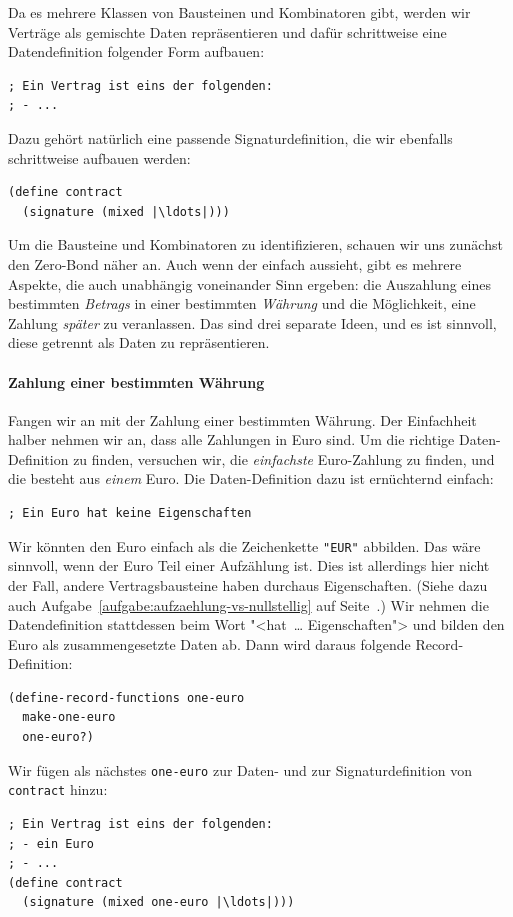 Da es mehrere Klassen von Bausteinen und Kombinatoren gibt, werden wir
Verträge als gemischte Daten repräsentieren und dafür schrittweise
eine Datendefinition folgender Form aufbauen:
%
\begin{lstlisting}
; Ein Vertrag ist eins der folgenden:
; - ...
\end{lstlisting}
%
Dazu gehört natürlich eine passende Signaturdefinition, die wir
ebenfalls schrittweise aufbauen werden:
%
\begin{lstlisting}
(define contract
  (signature (mixed |\ldots|)))
\end{lstlisting}
%
Um die Bausteine und Kombinatoren zu identifizieren, schauen wir uns
zunächst den Zero-Bond näher an.  Auch wenn der einfach aussieht, gibt
es mehrere Aspekte, die auch unabhängig voneinander Sinn ergeben: die
Auszahlung eines bestimmten \textit{Betrags} in einer bestimmten
\textit{Währung} und die Möglichkeit, eine Zahlung \textit{später} zu
veranlassen.  Das sind drei separate Ideen, und es ist sinnvoll, diese
getrennt als Daten zu repräsentieren.

\paragraph{Zahlung einer bestimmten Währung}
Fangen wir an mit der Zahlung einer bestimmten Währung.  Der
Einfachheit halber nehmen wir an, dass alle Zahlungen in Euro sind.
Um die richtige Daten-Definition zu finden, versuchen wir, die
\emph{einfachste} Euro-Zahlung zu finden, und die besteht aus
\emph{einem} Euro.  Die Daten-Definition dazu ist ernüchternd einfach:
%
\begin{lstlisting}
; Ein Euro hat keine Eigenschaften
\end{lstlisting}
%
Wir könnten den Euro einfach als die Zeichenkette \lstinline{"EUR"}
abbilden.  Das wäre sinnvoll, wenn der Euro Teil einer Aufzählung ist.
Dies ist allerdings hier nicht der Fall, andere Vertragsbausteine haben
durchaus Eigenschaften.  (Siehe dazu auch
Aufgabe~\ref{aufgabe:aufzaehlung-vs-nullstellig} auf
Seite~\pageref{aufgabe:aufzaehlung-vs-nullstellig}.)  Wir nehmen die
Datendefinition stattdessen beim Wort "<hat~\ldots{} Eigenschaften">
und bilden den Euro als zusammengesetzte Daten ab.  Dann wird daraus
folgende Record-Definition:
%
\begin{lstlisting}
(define-record-functions one-euro
  make-one-euro
  one-euro?)
\end{lstlisting}
%
Wir fügen als nächstes \lstinline{one-euro} zur Daten- und zur
Signaturdefinition von \lstinline{contract} hinzu:
%
\begin{lstlisting}
; Ein Vertrag ist eins der folgenden:
; - ein Euro
; - ...
(define contract
  (signature (mixed one-euro |\ldots|)))
\end{lstlisting}
%
